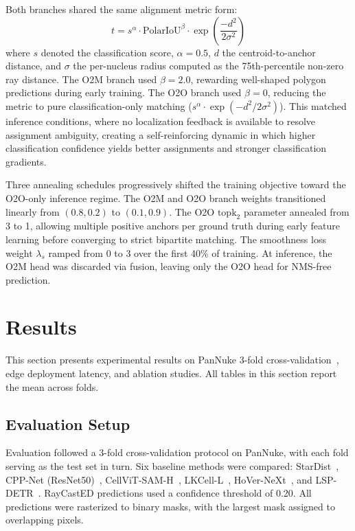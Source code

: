 \documentclass[conference]{IEEEtran}
\begin{document}
Both branches shared the same alignment metric form:
\begin{equation}
t = s^{\alpha} \cdot \text{PolarIoU}^{\beta} \cdot \exp\!\left(\frac{-d^2}{2\sigma^2}\right)
\end{equation}
where $s$ denoted the classification score, $\alpha=0.5$, $d$ the centroid-to-anchor distance, and $\sigma$ the per-nucleus radius computed as the 75th-percentile non-zero ray distance. The O2M branch used $\beta=2.0$, rewarding well-shaped polygon predictions during early training. The O2O branch used $\beta=0$, reducing the metric to pure classification-only matching ($s^{\alpha} \cdot \exp(-d^2/2\sigma^2)$). This matched inference conditions, where no localization feedback is available to resolve assignment ambiguity, creating a self-reinforcing dynamic in which higher classification confidence yields better assignments and stronger classification gradients.

Three annealing schedules progressively shifted the training objective toward the O2O-only inference regime. The O2M and O2O branch weights transitioned linearly from $(0.8, 0.2)$ to $(0.1, 0.9)$. The O2O $\text{topk}_2$ parameter annealed from 3 to 1, allowing multiple positive anchors per ground truth during early feature learning before converging to strict bipartite matching. The smoothness loss weight $\lambda_s$ ramped from 0 to 3 over the first 40\% of training. At inference, the O2M head was discarded via fusion, leaving only the O2O head for NMS-free prediction.

\section{Results}

This section presents experimental results on PanNuke 3-fold cross-validation~\cite{gamper2020pannuke}, edge deployment latency, and ablation studies. All tables in this section report the mean across folds.

\subsection{Evaluation Setup}

Evaluation followed a 3-fold cross-validation protocol on PanNuke, with each fold serving as the test set in turn. Six baseline methods were compared: StarDist~\cite{schmidt2018cell}, CPP-Net (ResNet50)~\cite{chen2023cppnet}, CellViT-SAM-H~\cite{horst2023cellvit}, LKCell-L~\cite{cui2024lkcell}, HoVer-NeXt~\cite{baumann2024hovernext}, and LSP-DETR~\cite{pekar2026lsp}. RayCastED predictions used a confidence threshold of 0.20. All predictions were rasterized to binary masks, with the largest mask assigned to overlapping pixels.
\end{document}

